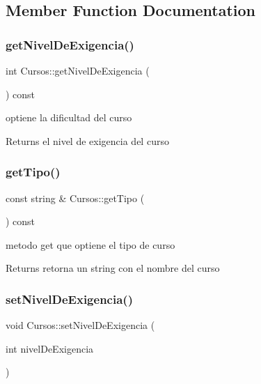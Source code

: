 \subsection{Member Function Documentation}
\mbox{\label{classCursos_af0bb720b647b2ddb8cc1d270d470de92}} 
\subsubsection{\texorpdfstring{get\+Nivel\+De\+Exigencia()}{getNivelDeExigencia()}}
{\footnotesize\ttfamily int Cursos\+::get\+Nivel\+De\+Exigencia (\begin{DoxyParamCaption}{ }\end{DoxyParamCaption}) const}



optiene la dificultad del curso 

\begin{DoxyReturn}{Returns}
el nivel de exigencia del curso 
\end{DoxyReturn}
\mbox{\label{classCursos_a3a9c6c23bc0889f0a02451d3828334f8}} 
\subsubsection{\texorpdfstring{get\+Tipo()}{getTipo()}}
{\footnotesize\ttfamily const string \& Cursos\+::get\+Tipo (\begin{DoxyParamCaption}{ }\end{DoxyParamCaption}) const}



metodo get que optiene el tipo de curso 

\begin{DoxyReturn}{Returns}
retorna un string con el nombre del curso 
\end{DoxyReturn}
\mbox{\label{classCursos_a8ec40cc7f7ea65b4f8e5f4333ad9ab75}} 
\subsubsection{\texorpdfstring{set\+Nivel\+De\+Exigencia()}{setNivelDeExigencia()}}
{\footnotesize\ttfamily void Cursos\+::set\+Nivel\+De\+Exigencia (\begin{DoxyParamCaption}\item[{int}]{nivel\+De\+Exigencia }\end{DoxyParamCaption})}



